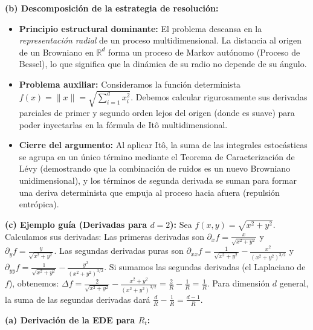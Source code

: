 \documentclass[11pt, letterpaper]{article}
\begin{document}
\begin{solucion}
    \textbf{(b) Descomposición de la estrategia de resolución:}
    \begin{itemize}
        \item[(i)] \textbf{Principio estructural dominante:} El problema descansa en la \textit{representación radial} de un proceso multidimensional. La distancia al origen de un Browniano en $\mathbb{R}^d$ forma un proceso de Markov autónomo (Proceso de Bessel), lo que significa que la dinámica de su radio no depende de su ángulo.
        \item[(ii)] \textbf{Problema auxiliar:} Consideramos la función determinista $f(x) = \|x\| = \sqrt{\sum_{i=1}^d x_i^2}$. Debemos calcular rigurosamente sus derivadas parciales de primer y segundo orden lejos del origen (donde es suave) para poder inyectarlas en la fórmula de Itô multidimensional.
        \item[(iii)] \textbf{Cierre del argumento:} Al aplicar Itô, la suma de las integrales estocásticas se agrupa en un único término mediante el Teorema de Caracterización de Lévy (demostrando que la combinación de ruidos es un nuevo Browniano unidimensional), y los términos de segunda derivada se suman para formar una deriva determinista que empuja al proceso hacia afuera (repulsión entrópica).
    \end{itemize}

    \vspace{3mm}
    \textbf{(c) Ejemplo guía (Derivadas para $d=2$):}
    Sea $f(x, y) = \sqrt{x^2 + y^2}$. Calculamos sus derivadas:
    Las primeras derivadas son $\partial_x f = \frac{x}{\sqrt{x^2+y^2}}$ y $\partial_y f = \frac{y}{\sqrt{x^2+y^2}}$.
    Las segundas derivadas puras son $\partial_{xx} f = \frac{1}{\sqrt{x^2+y^2}} - \frac{x^2}{(x^2+y^2)^{3/2}}$ y $\partial_{yy} f = \frac{1}{\sqrt{x^2+y^2}} - \frac{y^2}{(x^2+y^2)^{3/2}}$.
    Si sumamos las segundas derivadas (el Laplaciano de $f$), obtenemos:
    $\Delta f = \frac{2}{\sqrt{x^2+y^2}} - \frac{x^2+y^2}{(x^2+y^2)^{3/2}} = \frac{2}{R} - \frac{1}{R} = \frac{1}{R}$.
    Para dimensión $d$ general, la suma de las segundas derivadas dará $\frac{d}{R} - \frac{1}{R} = \frac{d-1}{R}$.

    \vspace{3mm}
    \textbf{(a) Derivación de la EDE para $R_t$:}


\end{solucion}
\end{document}
